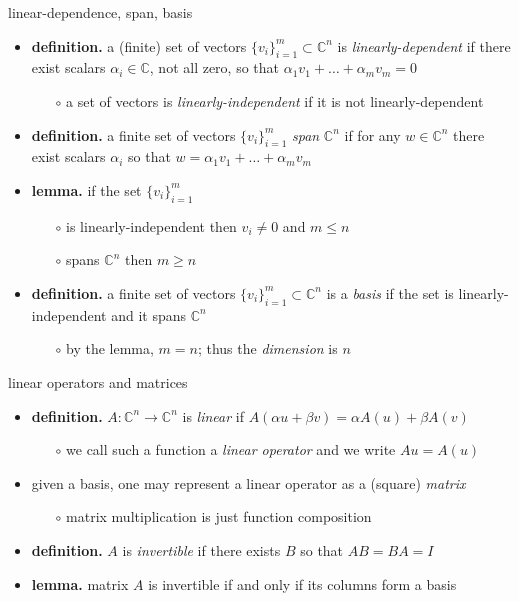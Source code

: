 \documentclass[10pt,hyperref]{beamer}
\newcommand{\CC}{\mathbb{C}}
\begin{document}
\begin{frame}{linear-dependence, span, basis}

\begin{itemize}
\item \textbf{definition.}  a (finite) set of vectors $\{v_i\}_{i=1}^m \subset \CC^n$ is \emph{linearly-dependent} if there exist scalars $\alpha_i \in \CC$, not all zero, so that $\alpha_1 v_1 + \dots + \alpha_m v_m = 0$
    \begin{itemize}
    \item[$\circ$] a set of vectors is \emph{linearly-independent} if it is not linearly-dependent
    \end{itemize}
\item \textbf{definition.}  a finite set of vectors $\{v_i\}_{i=1}^m$ \emph{span} $\CC^n$ if for any $w\in \CC^n$ there exist scalars $\alpha_i$ so that $w = \alpha_1 v_1 + \dots + \alpha_m v_m$
\item \textbf{lemma.}  if the set $\{v_i\}_{i=1}^m$
    \begin{itemize}
    \item[$\circ$] is linearly-independent then $v_i\ne 0$ and $m \le n$
    \item[$\circ$] spans $\CC^n$ then $m \ge n$
    \end{itemize}
\item \textbf{definition.} a finite set of vectors $\{v_i\}_{i=1}^m \subset \CC^n$ is a \emph{basis} if the set is linearly-independent and it spans $\CC^n$
    \begin{itemize}
    \item[$\circ$] by the lemma, $m=n$; thus the \emph{dimension} is $n$
    \end{itemize}
\end{itemize}
\end{frame}


\begin{frame}{linear operators and matrices}

\begin{itemize}
\item \textbf{definition.}  $A:\CC^n \to \CC^n$ is \emph{linear} if $A(\alpha u+\beta v) = \alpha A(u) + \beta A(v)$
    \begin{itemize}
    \item[$\circ$] we call such a function a \emph{linear operator} and we write $Au=A(u)$
    \end{itemize}
\item given a basis, one may represent a linear operator as a (square) \emph{matrix}
    \begin{itemize}
    \item[$\circ$] matrix multiplication is just function composition
    \end{itemize}
\item \textbf{definition.} $A$ is \emph{invertible} if there exists $B$ so that $AB=BA=I$
\item \textbf{lemma.} matrix $A$ is invertible if and only if its columns form a basis
\end{itemize}
\end{frame}
\end{document}
